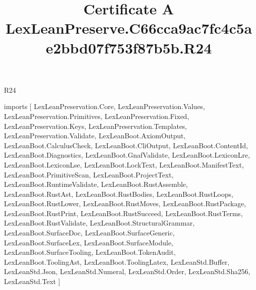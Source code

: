 \begin{lexlean}{R24}
\title{Certificate A LexLeanPreserve.C66cca9ac7fc4c5ae2bbd07f753f87b5b.R24}
\begin{coremodule}
imports [
  LexLeanPreservation.Core,
  LexLeanPreservation.Values,
  LexLeanPreservation.Primitives,
  LexLeanPreservation.Fixed,
  LexLeanPreservation.Keys,
  LexLeanPreservation.Templates,
  LexLeanPreservation.Validate,
  LexLeanBoot.AxiomOutput,
  LexLeanBoot.CalculusCheck,
  LexLeanBoot.CliOutput,
  LexLeanBoot.ContentId,
  LexLeanBoot.Diagnostics,
  LexLeanBoot.GnafValidate,
  LexLeanBoot.LexiconLre,
  LexLeanBoot.LexiconLse,
  LexLeanBoot.LockText,
  LexLeanBoot.ManifestText,
  LexLeanBoot.PrimitiveScan,
  LexLeanBoot.ProjectText,
  LexLeanBoot.RuntimeValidate,
  LexLeanBoot.RustAssemble,
  LexLeanBoot.RustAst,
  LexLeanBoot.RustBodies,
  LexLeanBoot.RustLoops,
  LexLeanBoot.RustLower,
  LexLeanBoot.RustMoves,
  LexLeanBoot.RustPackage,
  LexLeanBoot.RustPrint,
  LexLeanBoot.RustSucceed,
  LexLeanBoot.RustTerms,
  LexLeanBoot.RustValidate,
  LexLeanBoot.StructuralGrammar,
  LexLeanBoot.SurfaceDoc,
  LexLeanBoot.SurfaceGeneric,
  LexLeanBoot.SurfaceLex,
  LexLeanBoot.SurfaceModule,
  LexLeanBoot.SurfaceTooling,
  LexLeanBoot.TokenAudit,
  LexLeanBoot.ToolingAst,
  LexLeanBoot.ToolingLatex,
  LexLeanStd.Buffer,
  LexLeanStd.Json,
  LexLeanStd.Numeral,
  LexLeanStd.Order,
  LexLeanStd.Sha256,
  LexLeanStd.Text
]


\end{coremodule}
\end{lexlean}
